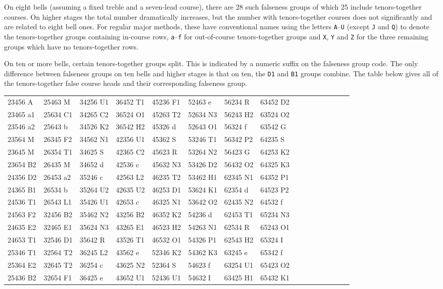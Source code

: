 \documentclass[a4paper,11pt,oneside]{book}
\begin{document}
On eight bells (assuming a fixed treble and a seven-lead course), 
there are 28 such falseness groups of which 25 include tenors-together courses.
On higher stages the total number dramatically increases, but the number
with tenors-together courses does not significantly and are related to eight
bell ones.
For regular major methods, these have 
conventional names using the letters \verb+A+--\verb+U+ (except \verb+J+
and \verb+Q+) to denote the tenors-together groups containing in-course rows,
\verb+a+--\verb+f+ for out-of-course 
tenors-together groups and \verb+X+, \verb+Y+ and \verb+Z+ for the three 
remaining groups which have no tenors-together rows.  

On ten or more bells, certain tenors-together groups split.  This is 
indicated by a numeric suffix on the falseness group code.  The only 
difference between falseness groups on ten bells and higher stages is that 
on ten, the \verb+D1+ and \verb+B1+ groups combine.  The table below gives
all of the tenors-together false course heads and their corresponding 
falseness group.

{\tt\tiny\begin{center}\begin{tabular}{ll ll ll ll ll ll ll ll}
23456 A&25463 M&34256 U1&36452 T1&45236 F1&52463 e&56234 R&63452 D2\\
23465 a1&25634 C1&34265 C2&36524 O1&45263 T2&52634 N3&56243 H2&63524 O2\\
23546 a2&25643 b&34526 K2&36542 H2&45326 d&52643 O1&56324 f&63542 G\\
23564 M&26345 F2&34562 N1&42356 U1&45362 S&53246 T1&56342 P2&64235 S\\
23645 M&26354 T1&34625 S&42365 C2&45623 R&53264 N2&56423 G&64253 K2\\
23654 B2&26435 M&34652 d&42536 c&45632 N3&53426 D2&56432 O2&64325 K3\\
24356 D2&26453 a2&35246 c&42563 L2&46235 T2&53462 H1&62345 N1&64352 P1\\
24365 B1&26534 b&35264 U2&42635 U2&46253 D1&53624 K1&62354 d&64523 P2\\
24536 T1&26543 L1&35426 U1&42653 c&46325 N1&53642 O2&62435 N2&64532 f\\
24563 F2&32456 B2&35462 N2&43256 B2&46352 K2&54236 d&62453 T1&65234 N3\\
24635 E2&32465 E1&35624 N3&43265 E1&46523 H2&54263 N1&62534 R&65243 O1\\
24653 T1&32546 D1&35642 R&43526 T1&46532 O1&54326 P1&62543 H2&65324 I\\
25346 T1&32564 T2&36245 L2&43562 e&52346 K2&54362 K3&63245 e&65342 f\\
25364 E2&32645 T2&36254 c&43625 N2&52364 S&54623 f&63254 U1&65423 O2\\
25436 B2&32654 F1&36425 e&43652 U1&52436 U1&54632 I&63425 H1&65432 K1\\
\end{tabular}\end{center}}
\end{document}
